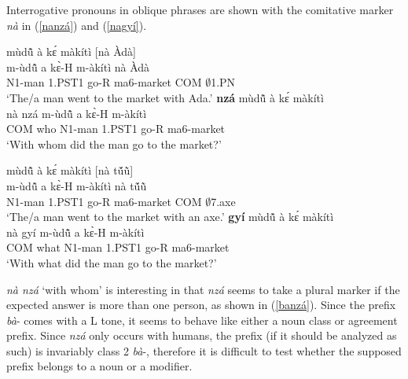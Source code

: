 Interrogative pronouns in oblique phrases are shown with the comitative marker {\itshape nà} in (\ref{nanzá}) and (\ref{nagyí}).

\begin{exe}
\ex\label{nanzá}
\begin{xlist}
\ex \label{nanzá1}
  \glll    mùdũ̂ à kɛ́ màkítì [nà Àdà] \\
           m-ùdũ̂ a kɛ̀-H m-àkítì nà Àdà \\
              N1-man 1.PST1 go-R ma6-market COM $\emptyset$1.PN  \\
    \trans `The/a man went to the market with Ada.'
\ex\label{nanzá2}
  {\bfseries nzá} mùdũ̂ à kɛ́ màkítì  \\
       nà nzá m-ùdũ̂ a kɛ̀-H m-àkítì  \\
           COM who N1-man 1.PST1 go-R ma6-market\\
    \trans `With whom did the man go to the market?'
\end {xlist}
\end {exe}

\begin{exe}
\ex\label{nagyí}
\begin{xlist}
\ex \label{nagyí1}
  \glll    mùdũ̂ à kɛ́ màkítì [nà  tṹũ̀]\\
                 m-ùdũ̂ a kɛ̀-H m-àkítì nà  tṹũ̀ \\
              N1-man 1.PST1 go-R ma6-market COM $\emptyset$7.axe \\
    \trans `The/a man went to the market with an axe.'
\ex\label{nagyí2}
  {\bfseries gyí} mùdũ̂ à kɛ́ màkítì \\
         nà gyí m-ùdũ̂ a kɛ̀-H m-àkítì  \\
             COM what N1-man 1.PST1 go-R ma6-market \\
    \trans `With what did the man go to the market?'
\end {xlist}
\end {exe}


{\itshape nà nzá} `with whom' is interesting in that {\itshape nzá} seems to take a plural marker if the expected answer is more than one person, as shown in (\ref{banzá}). Since the prefix {\itshape bà}- comes with a L tone, it seems to behave like either a noun class or agreement prefix. Since {\itshape nzá} only occurs with humans, the prefix (if it should be analyzed as such) is invariably class 2 {\itshape bà}-, therefore it is difficult to test whether the supposed prefix belongs to a noun or a modifier.

